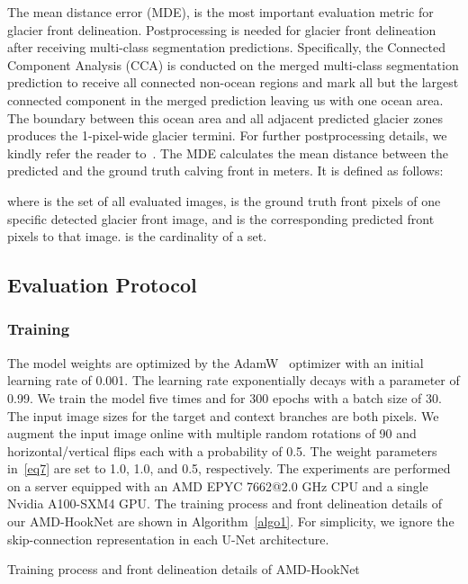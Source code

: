 \documentclass[lettersize,journal,siunitx]{IEEEtran}
\begin{document}
The mean distance error (MDE), is the most important evaluation metric for glacier front delineation. Postprocessing is needed for glacier front delineation after receiving multi-class segmentation predictions. Specifically, the Connected Component Analysis (CCA) is conducted on the merged multi-class segmentation prediction to receive all connected non-ocean regions and mark all but the largest connected component in the merged prediction leaving us with one ocean area. The boundary between this ocean area and all adjacent predicted glacier zones produces the 1-pixel-wide glacier termini. For further postprocessing details, we kindly refer the reader to~\cite{essd-14-4287-2022}. The MDE calculates the mean distance between the predicted and the ground truth calving front in meters. It is defined as follows:

where  is the set of all evaluated images,  is the ground truth front pixels of one specific detected glacier front image, and  is the corresponding predicted front pixels to that image.  is the cardinality of a set.

\subsection{Evaluation Protocol}
\subsubsection{Training}
The model weights are optimized by the AdamW~\cite{kingma2014adam} optimizer with an initial learning rate of 0.001. The learning rate exponentially decays with a parameter of 0.99. We train the model five times and for 300 epochs with a batch size of 30. The input image sizes for the target and context branches are both  pixels. We augment the input image online with multiple random rotations of 90 and horizontal/vertical flips each with a probability of 0.5. The weight parameters  in~\cref{eq7} are set to 1.0, 1.0, and 0.5, respectively. The experiments are performed on a server equipped with an AMD EPYC 7662@2.0 GHz CPU and a single Nvidia A100-SXM4 GPU. The training process and front delineation details of our AMD-HookNet are shown in Algorithm~\ref{algo1}. For simplicity, we ignore the skip-connection representation in each U-Net architecture.

\begin{algorithm}[t]
\caption{Training process and front delineation details of AMD-HookNet}
\label{algo1}
\begin{algorithmic}[1]
\While{}
\If{}
\Else
{}
\EndIf
\EndFor
{}
\State{\}}
\EndWhile
{}
\end{algorithmic}
\end{algorithm}
\end{document}
